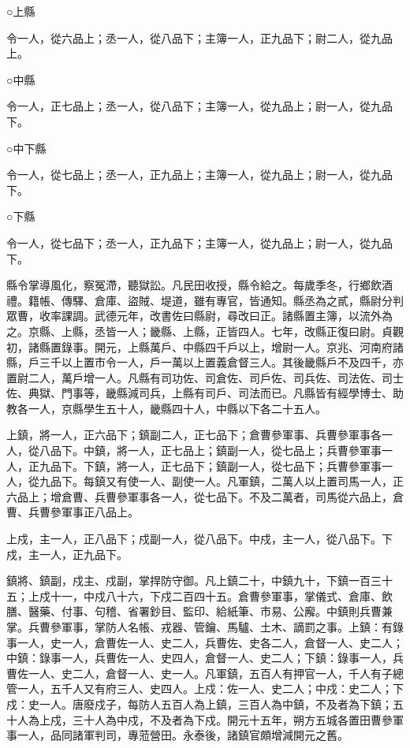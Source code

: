 \begin{pinyinscope}
 ○上縣



 令一人，從六品上；丞一人，從八品下；主簿一人，正九品下；尉二人，從九品上。



 ○中縣



 令一人，正七品上；丞一人，從八品下；主簿一人，從九品上；尉一人，從九品下。



 ○中下縣



 令一人，從七品上；丞一人，正九品上；主簿一人，從九品上；尉一人，從九品下。



 ○下縣



 令一人，從七品下；丞一人，正九品下；主簿一人，從九品上；尉一人，從九品下。



 縣令掌導風化，察冤滯，聽獄訟。凡民田收授，縣令給之。每歲季冬，行鄉飲酒禮。籍帳、傳驛、倉庫、盜賊、堤道，雖有專官，皆通知。縣丞為之貳，縣尉分判眾曹，收率課調。武德元年，改書佐曰縣尉，尋改曰正。諸縣置主簿，以流外為之。京縣、上縣，丞皆一人；畿縣、上縣，正皆四人。七年，改縣正復曰尉。貞觀初，諸縣置錄事。開元，上縣萬戶、中縣四千戶以上，增尉一人。京兆、河南府諸縣，戶三千以上置市令一人，戶一萬以上置義倉督三人。其後畿縣戶不及四千，亦置尉二人，萬戶增一人。凡縣有司功佐、司倉佐、司戶佐、司兵佐、司法佐、司士佐、典獄、門事等，畿縣減司兵，上縣有司戶、司法而已。凡縣皆有經學博士、助教各一人，京縣學生五十人，畿縣四十人，中縣以下各二十五人。



 上鎮，將一人，正六品下；鎮副二人，正七品下；倉曹參軍事、兵曹參軍事各一人，從八品下。中鎮，將一人，正七品上；鎮副一人，從七品上；兵曹參軍事一人，正九品下。下鎮，將一人，正七品下；鎮副一人，從七品下；兵曹參軍事一人，從九品下。每鎮又有使一人、副使一人。凡軍鎮，二萬人以上置司馬一人，正六品上；增倉曹、兵曹參軍事各一人，從七品下。不及二萬者，司馬從六品上，倉曹、兵曹參軍事正八品上。



 上戍，主一人，正八品下；戍副一人，從八品下。中戍，主一人，從八品下。下戍，主一人，正九品下。



 鎮將、鎮副，戍主、戍副，掌捍防守御。凡上鎮二十，中鎮九十，下鎮一百三十五；上戍十一，中戍八十六，下戍二百四十五。倉曹參軍事，掌儀式、倉庫、飲膳、醫藥、付事、句稽、省署鈔目、監印、給紙筆、市易、公廨。中鎮則兵曹兼掌。兵曹參軍事，掌防人名帳、戎器、管鑰、馬驢、土木、謫罰之事。上鎮：有錄事一人，史一人，倉曹佐一人、史二人，兵曹佐、史各二人，倉督一人、史二人；中鎮：錄事一人，兵曹佐一人、史四人，倉督一人、史二人；下鎮：錄事一人，兵曹佐一人、史二人，倉督一人、史一人。凡軍鎮，五百人有押官一人，千人有子總管一人，五千人又有府三人、史四人。上戍：佐一人、史二人；中戍：史二人；下戍：史一人。唐廢戍子，每防人五百人為上鎮，三百人為中鎮，不及者為下鎮；五十人為上戍，三十人為中戍，不及者為下戍。開元十五年，朔方五城各置田曹參軍事一人，品同諸軍判司，專蒞營田。永泰後，諸鎮官頗增減開元之舊。




\end{pinyinscope}
